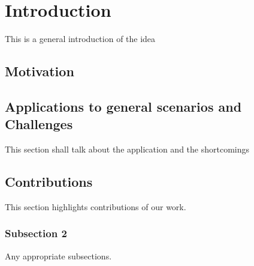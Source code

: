 \documentclass[12pt]{report}
\begin{document}
\tableofcontents
\pagebreak

\listoffigures
\pagebreak

\listoftables
\pagebreak

\printacronyms
\pagebreak

\pagestyle{myheadings}



\chapter{Introduction} %

\label{introduction} %

This is a general introduction of the idea

\section{Motivation}

\section{Applications to general scenarios and Challenges}
This section shall talk about the application and the shortcomings






\section{Contributions}

This section highlights contributions of our work.

\subsection{Subsection 2}
Any appropriate subsections. 
\end{document}
